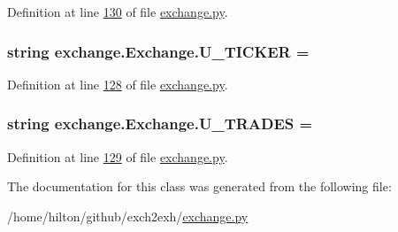 Definition at line \hyperlink{exchange_8py_source_l00130}{130} of file \hyperlink{exchange_8py_source}{exchange.\+py}.

\subsubsection[{\texorpdfstring{U\+\_\+\+T\+I\+C\+K\+ER}{U_TICKER}}]{\setlength{\rightskip}{0pt plus 5cm}string exchange.\+Exchange.\+U\+\_\+\+T\+I\+C\+K\+ER = \textquotesingle{}\textquotesingle{}\hspace{0.3cm}{\ttfamily [static]}}\hypertarget{classexchange_1_1_exchange_ab16df02480d727c533b02b5b7afa053b}{}\label{classexchange_1_1_exchange_ab16df02480d727c533b02b5b7afa053b}


Definition at line \hyperlink{exchange_8py_source_l00128}{128} of file \hyperlink{exchange_8py_source}{exchange.\+py}.

\subsubsection[{\texorpdfstring{U\+\_\+\+T\+R\+A\+D\+ES}{U_TRADES}}]{\setlength{\rightskip}{0pt plus 5cm}string exchange.\+Exchange.\+U\+\_\+\+T\+R\+A\+D\+ES = \textquotesingle{}\textquotesingle{}\hspace{0.3cm}{\ttfamily [static]}}\hypertarget{classexchange_1_1_exchange_aafa0e023de170f51cbf9d48e1154587a}{}\label{classexchange_1_1_exchange_aafa0e023de170f51cbf9d48e1154587a}


Definition at line \hyperlink{exchange_8py_source_l00129}{129} of file \hyperlink{exchange_8py_source}{exchange.\+py}.



The documentation for this class was generated from the following file\+:\begin{DoxyCompactItemize}
\item 
/home/hilton/github/exch2exh/\hyperlink{exchange_8py}{exchange.\+py}\end{DoxyCompactItemize}
